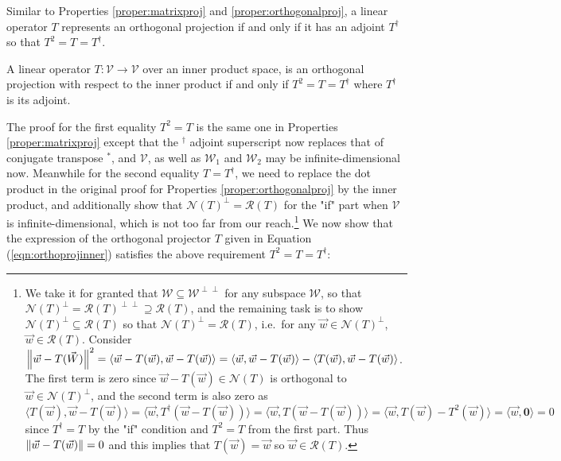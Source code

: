Similar to Properties \ref{proper:matrixproj} and \ref{proper:orthogonalproj}, a linear operator $T$ represents an orthogonal projection if and only if it has an adjoint $T^\dag$ so that $T^2 = T = T^\dag$.
\begin{proper}
\label{proper:orthoprojadjoint}
A linear operator $T: \mathcal{V} \to \mathcal{V}$ over an inner product space, is an orthogonal projection with respect to the inner product if and only if $T^2 = T = T^\dag$ where $T^\dag$ is its adjoint.
\end{proper}
The proof for the first equality $T^2 = T$ is the same one in Properties \ref{proper:matrixproj} except that the $^\dag$ adjoint superscript now replaces that of conjugate transpose $^*$, and $\mathcal{V}$, as well as $\mathcal{W}_1$ and $\mathcal{W}_2$ may be infinite-dimensional now. Meanwhile for the second equality $T = T^\dag$, we need to replace the dot product in the original proof for Properties \ref{proper:orthogonalproj} by the inner product, and additionally show that $\mathcal{N}(T)^\perp = \mathcal{R}(T)$ for the "if" part when $\mathcal{V}$ is infinite-dimensional, which is not too far from our reach.\footnote{We take it for granted that $\mathcal{W} \subseteq \mathcal{W}^{\perp\perp}$ for any subspace $\mathcal{W}$, so that $\mathcal{N}(T)^\perp = \mathcal{R}(T)^{\perp\perp} \supseteq \mathcal{R}(T)$, and the remaining task is to show $\mathcal{N}(T)^\perp \subseteq \mathcal{R}(T)$ so that $\mathcal{N}(T)^\perp = \mathcal{R}(T)$, i.e.\ for any $\vec{w} \in \mathcal{N}(T)^\perp$, $\vec{w} \in \mathcal{R}(T)$. Consider $\norm{\vec{w} - T(\vec{W})}^2 = \langle \vec{w} - T(\vec{w}), \vec{w} - T(\vec{w}) \rangle = \langle \vec{w}, \vec{w} - T(\vec{w}) \rangle - \langle T(\vec{w}), \vec{w} - T(\vec{w}) \rangle$. The first term is zero since $\vec{w} - T(\vec{w}) \in \mathcal{N}(T)$ is orthogonal to $\vec{w} \in \mathcal{N}(T)^\perp$, and the second term is also zero as $\langle T(\vec{w}), \vec{w} - T(\vec{w}) \rangle = \langle \vec{w}, T^\dag(\vec{w} - T(\vec{w})) \rangle = \langle \vec{w}, T(\vec{w} - T(\vec{w})) \rangle = \langle \vec{w}, T(\vec{w}) - T^2(\vec{w}) \rangle = \langle \vec{w}, \textbf{0} \rangle = 0$ since $T^\dag = T$ by the "if" condition and $T^2 = T$ from the first part. Thus $\norm{\vec{w} - T(\vec{w})} = 0$ and this implies that $T(\vec{w}) = \vec{w}$ so $\vec{w} \in \mathcal{R}(T)$.} We now show that the expression of the orthogonal projector $T$ given in Equation (\ref{eqn:orthoprojinner}) satisfies the above requirement $T^2 = T = T^\dag$:
